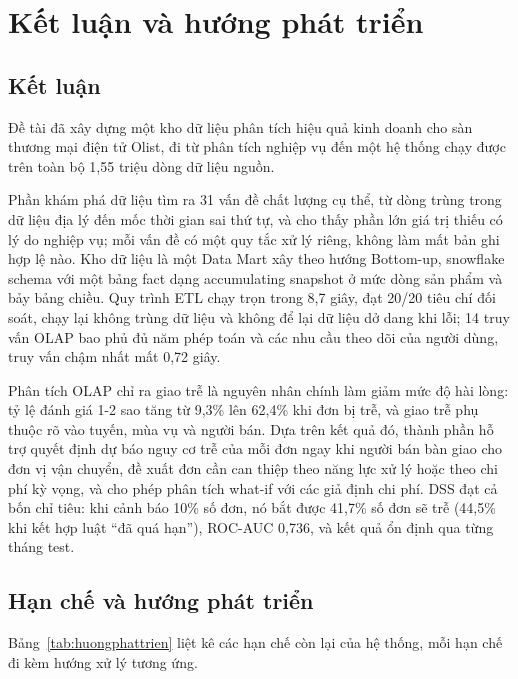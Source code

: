 \section{Kết luận và hướng phát triển}\label{sec:ketluan}

\subsection{Kết luận}

Đề tài đã xây dựng một kho dữ liệu phân tích hiệu quả kinh doanh cho sàn thương mại điện tử Olist, đi từ phân tích nghiệp vụ đến một hệ thống chạy được trên toàn bộ 1,55 triệu dòng dữ liệu nguồn.

Phần khám phá dữ liệu tìm ra 31 vấn đề chất lượng cụ thể, từ dòng trùng trong dữ liệu địa lý đến mốc thời gian sai thứ tự, và cho thấy phần lớn giá trị thiếu có lý do nghiệp vụ; mỗi vấn đề có một quy tắc xử lý riêng, không làm mất bản ghi hợp lệ nào. Kho dữ liệu là một Data Mart xây theo hướng Bottom-up, snowflake schema với một bảng fact dạng accumulating snapshot ở mức dòng sản phẩm và bảy bảng chiều. Quy trình ETL chạy trọn trong 8,7 giây, đạt 20/20 tiêu chí đối soát, chạy lại không trùng dữ liệu và không để lại dữ liệu dở dang khi lỗi; 14 truy vấn OLAP bao phủ đủ năm phép toán và các nhu cầu theo dõi của người dùng, truy vấn chậm nhất mất 0,72 giây.

Phân tích OLAP chỉ ra giao trễ là nguyên nhân chính làm giảm mức độ hài lòng: tỷ lệ đánh giá 1-2 sao tăng từ 9,3\% lên 62,4\% khi đơn bị trễ, và giao trễ phụ thuộc rõ vào tuyến, mùa vụ và người bán. Dựa trên kết quả đó, thành phần hỗ trợ quyết định dự báo nguy cơ trễ của mỗi đơn ngay khi người bán bàn giao cho đơn vị vận chuyển, đề xuất đơn cần can thiệp theo năng lực xử lý hoặc theo chi phí kỳ vọng, và cho phép phân tích what-if với các giả định chi phí. DSS đạt cả bốn chỉ tiêu: khi cảnh báo 10\% số đơn, nó bắt được 41,7\% số đơn sẽ trễ (44,5\% khi kết hợp luật ``đã quá hạn''), ROC-AUC 0,736, và kết quả ổn định qua từng tháng test.

\subsection{Hạn chế và hướng phát triển}\label{sec:huongphattrien}

Bảng~\ref{tab:huongphattrien} liệt kê các hạn chế còn lại của hệ thống, mỗi hạn chế đi kèm hướng xử lý tương ứng.

